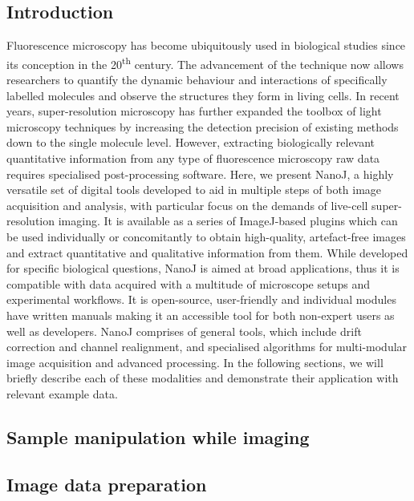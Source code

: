 \subsection*{Introduction}
  Fluorescence microscopy has become ubiquitously used in biological studies since its conception in the 20\textsuperscript{th} century. The advancement of the technique now allows researchers to quantify the dynamic behaviour and interactions of specifically labelled molecules and observe the structures they form in living cells. In recent years, super-resolution microscopy has further expanded the toolbox of light microscopy techniques by increasing the detection precision of existing methods down to the single molecule level. However, extracting biologically relevant quantitative information from any type of fluorescence microscopy raw data requires specialised post-processing software.
  \newline
  Here, we present NanoJ, a highly versatile set of digital tools developed to aid in multiple steps of both image acquisition and analysis, with particular focus on the demands of live-cell super-resolution imaging. It is available as a series of ImageJ-based plugins which can be used individually or concomitantly to obtain high-quality, artefact-free images and extract quantitative and qualitative information from them. While developed for specific biological questions, NanoJ is aimed at broad applications, thus it is compatible with data acquired with a multitude of microscope setups and experimental workflows. It is open-source, user-friendly and individual modules have written manuals making it an accessible tool for both non-expert users as well as developers.
  NanoJ comprises of general tools, which include drift correction and channel realignment, and specialised algorithms for multi-modular image acquisition and advanced processing. In the following sections, we will briefly describe each of these modalities and demonstrate their application with relevant example data.
  
\subsection*{Sample manipulation while imaging}
\Blindtext

\subsection*{Image data preparation}
\Blindtext


